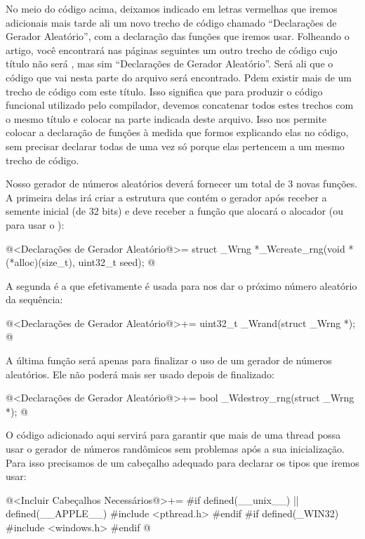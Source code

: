 No meio do código acima, deixamos indicado em letras vermelhas que
iremos adicionais mais tarde ali um novo trecho de código chamado
``Declarações de Gerador Aleatório'', com a declaração das funções que
iremos usar. Folheando o artigo, você encontrará nas páginas seguintes
um outro trecho de código cujo título não será ,
mas sim ``Declarações de Gerador Aleatório''. Será ali que o código que
vai nesta parte do arquivo será encontrado. Pdem existir mais de um
trecho de código com este título. Isso significa que para produzir o
código funcional utilizado pelo compilador, devemos concatenar todos
estes trechos com o mesmo título e colocar na parte indicada deste
arquivo. Isso nos permite colocar a declaração de funções à medida que
formos explicando elas no código, sem precisar declarar todas de uma
vez só porque elas pertencem a um mesmo trecho de código.


Nosso gerador de números aleatórios deverá fornecer um total de 3
novas funções. A primeira delas irá criar a estrutura que contém o
gerador após receber a semente inicial (de 32 bits) e deve receber a
função que alocará o alocador (ou  para usar
o ):

\iniciocodigo
@<Declarações de Gerador Aleatório@>=
struct _Wrng *_Wcreate_rng(void *(*alloc)(size_t), uint32_t seed);
@
\fimcodigo

A segunda é a que efetivamente é usada para nos dar o próximo número
aleatório da sequência:

\iniciocodigo
@<Declarações de Gerador Aleatório@>+=
uint32_t _Wrand(struct _Wrng *);
@
\fimcodigo

A última função será apenas para finalizar o uso de um gerador de
números aleatórios. Ele não poderá mais ser usado depois de
finalizado:

\iniciocodigo
@<Declarações de Gerador Aleatório@>+=
bool _Wdestroy_rng(struct _Wrng *);
@
\fimcodigo


O código adicionado aqui servirá para garantir que mais de uma thread
possa usar o gerador de números randômicos sem problemas após a sua
inicialização. Para isso precisamos de um cabeçalho adequado para
declarar os tipos que iremos usar:

\iniciocodigo
@<Incluir Cabeçalhos Necessários@>+=
#if defined(__unix__) || defined(__APPLE__)
#include <pthread.h>
#endif
#if defined(_WIN32)
#include <windows.h>
#endif
@
\fimcodigo

